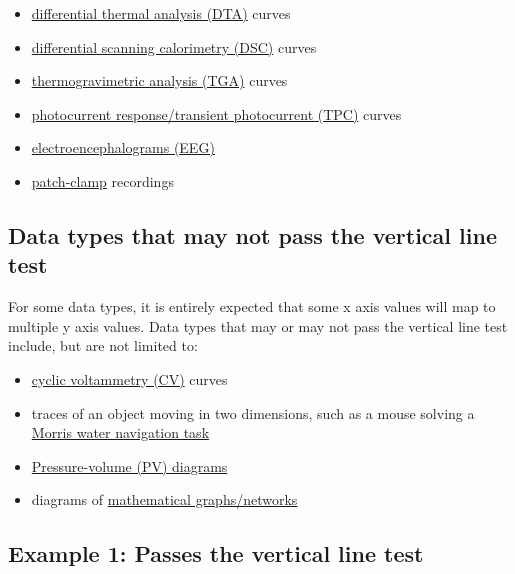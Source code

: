 \documentclass[letterpaper, 12pt]{article}
\begin{document}
\begin{itemize}
    \item \href{https://en.wikipedia.org/wiki/Differential_thermal_analysis}{differential thermal analysis (DTA)} curves
    \item \href{https://en.wikipedia.org/wiki/Differential_scanning_calorimetry}{differential scanning calorimetry (DSC)} curves
    \item \href{https://en.wikipedia.org/wiki/Thermogravimetric_analysis}{thermogravimetric analysis (TGA)} curves
    \item \href{https://en.wikipedia.org/wiki/Transient_photocurrent}{photocurrent response/transient photocurrent (TPC)} curves
    \item \href{https://en.wikipedia.org/wiki/Electroencephalography}{electroencephalograms (EEG)}
    \item \href{https://en.wikipedia.org/wiki/Patch_clamp}{patch-clamp} recordings
\end{itemize}

\subsection*{Data types that may not pass the vertical line test}

For some data types, it is entirely expected that some x axis values will map to multiple y axis values. Data types that may or may not pass the vertical line test include, but are not limited to:

\begin{itemize}
    \setlength\itemsep{-0.5em}
    \item \href{https://en.wikipedia.org/wiki/Cyclic_voltammetry}{cyclic voltammetry (CV)} curves
    \item traces of an object moving in two dimensions, such as a mouse solving a \href{https://en.wikipedia.org/wiki/Morris_water_navigation_task}{Morris water navigation task}
    \item \href{https://en.wikipedia.org/wiki/Pressure%E2%80%93volume_diagram}{Pressure-volume (PV) diagrams}
    \item diagrams of \href{https://en.wikipedia.org/wiki/Graph_theory}{mathematical graphs/networks}
\end{itemize}

\pagebreak

\subsection*{Example 1: Passes the vertical line test}
\end{document}
